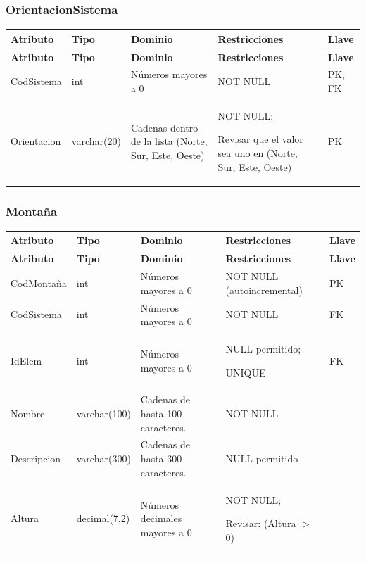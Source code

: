 \subsubsection*{OrientacionSistema}

\begin{longtable}{p{2.2cm} p{2.2cm} p{5.8cm} p{4.2cm} p{1.5cm}}
\toprule
\textbf{Atributo} & \textbf{Tipo} & \textbf{Dominio} & \textbf{Restricciones} & \textbf{Llave} \\
\midrule
\endfirsthead

\toprule
\textbf{Atributo} & \textbf{Tipo} & \textbf{Dominio} & \textbf{Restricciones} & \textbf{Llave} \\
\midrule
\endhead

\bottomrule
\endfoot


CodSistema
& int
& Números mayores a 0
& NOT NULL
& PK, FK \\

Orientacion
& varchar(20)
& Cadenas dentro de la lista (Norte, Sur, Este, Oeste)
& NOT NULL;

Revisar que el valor sea uno en (Norte, Sur, Este, Oeste)
& PK \\

\end{longtable}


\subsubsection*{Montaña}

\begin{longtable}{p{2.2cm} p{2.2cm} p{5.8cm} p{4.2cm} p{1.5cm}}
\toprule
\textbf{Atributo} & \textbf{Tipo} & \textbf{Dominio} & \textbf{Restricciones} & \textbf{Llave} \\
\midrule
\endfirsthead

\toprule
\textbf{Atributo} & \textbf{Tipo} & \textbf{Dominio} & \textbf{Restricciones} & \textbf{Llave} \\
\midrule
\endhead

\bottomrule
\endfoot


CodMontaña
& int
& Números mayores a 0
& NOT NULL (autoincremental)
& PK \\

CodSistema
& int
& Números mayores a 0
& NOT NULL
& FK \\

IdElem
& int
& Números mayores a 0
& NULL permitido;

UNIQUE
& FK \\

Nombre
& varchar(100)
& Cadenas de hasta 100 caracteres.
& NOT NULL
&  \\

Descripcion
& varchar(300)
& Cadenas de hasta 300 caracteres.
& NULL permitido
&  \\

Altura
& decimal(7,2)
& Números decimales mayores a 0
& NOT NULL;

Revisar: (Altura $>$ 0)
&  \\

\end{longtable}


